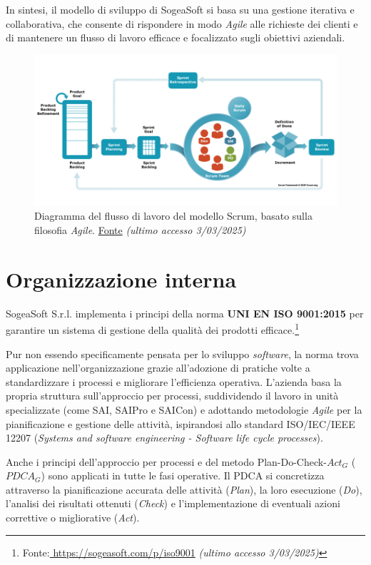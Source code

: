     \noindent In sintesi, il modello di sviluppo di SogeaSoft si basa su una gestione iterativa e collaborativa, che consente di rispondere in modo \textit{Agile} alle richieste dei clienti e di mantenere un flusso di lavoro efficace e focalizzato sugli obiettivi aziendali.

    \begin{figure}[H]
        \centering
        \includegraphics[width=0.8\linewidth]{BCS-Tessi/images/scrum_flow.png}
        \caption{Diagramma del flusso di lavoro del modello Scrum, basato sulla filosofia \textit{Agile}. \href{https://www.scrum.org/learning-series/what-is-scrum/}{Fonte} \textit{(ultimo accesso 3/03/2025)}}
        \label{fig:scrum_flow}
    \end{figure}
    
    \section{Organizzazione interna}
    SogeaSoft S.r.l. implementa i principi della norma \textbf{UNI EN ISO 9001:2015} per garantire un sistema di gestione della qualità dei prodotti efficace.\footnote{Fonte:\href{https://sogeasoft.com/p/iso9001}{ https://sogeasoft.com/p/iso9001} \textit{(ultimo accesso 3/03/2025)}}
    
    
    \noindent Pur non essendo specificamente pensata per lo sviluppo \textit{software}, la norma trova applicazione nell’organizzazione grazie all’adozione di pratiche volte a standardizzare i processi e migliorare l’efficienza operativa. L'azienda basa la propria struttura sull'approccio per processi, suddividendo il lavoro in unità specializzate (come SAI, SAIPro e SAICon) e adottando metodologie \textit{Agile} per la pianificazione e gestione delle attività, ispirandosi allo standard ISO/IEC/IEEE 12207 (\textit{Systems and software engineering - Software life cycle processes}).

    \noindent Anche i principi dell’approccio per processi e del metodo Plan-Do-Check-$Act_G$ ($PDCA_G$) sono applicati in tutte le fasi operative. Il PDCA si concretizza attraverso la pianificazione accurata delle attività (\textit{Plan}), la loro esecuzione (\textit{Do}), l’analisi dei risultati ottenuti (\textit{Check}) e l’implementazione di eventuali azioni correttive o migliorative (\textit{Act}).

